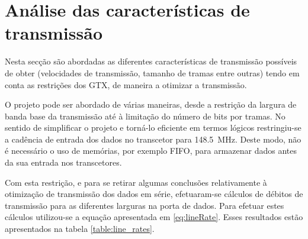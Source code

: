 \section{Análise das características de transmissão}

Nesta secção são abordadas as diferentes características de transmissão possíveis de obter (velocidades de transmissão, tamanho de tramas entre outras) tendo em conta as restrições dos GTX, de maneira a otimizar a transmissão.

O projeto pode ser abordado de várias maneiras, desde a restrição da largura de banda base da transmissão até à limitação do número de bits por tramas. No sentido de simplificar o projeto e torná-lo eficiente em termos lógicos restringiu-se a cadência de entrada dos dados no transcetor para \SI{148.5}{\mega\hertz}. Deste modo, não é necessário o uso de memórias, por exemplo FIFO, para armazenar dados antes da sua entrada nos transcetores.

Com esta restrição, e para se retirar algumas conclusões relativamente à otimização de transmissão dos dados em série, efetuaram-se cálculos de débitos de transmissão para as diferentes larguras na porta de dados. Para efetuar estes cálculos utilizou-se a equação apresentada em \ref{eq:lineRate}. Esses resultados estão apresentados na tabela \ref{table:line_rates}.

